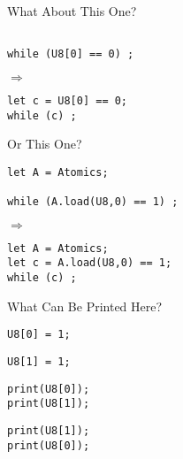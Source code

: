 \documentclass{beamer}
\begin{document}
\begin{frame}[fragile]{What About This One?}
  \begin{minipage}{.45\textwidth}
    \begin{lstlisting}

while (U8[0] == 0) ;
    \end{lstlisting}
  \end{minipage}%
  \hfill$\Rightarrow$\hfill
  \begin{minipage}{.45\textwidth}
    \begin{lstlisting}
let c = U8[0] == 0;
while (c) ;
    \end{lstlisting}
  \end{minipage}
\end{frame}

\begin{frame}[fragile]{Or This One?}
  \begin{minipage}{.45\textwidth}
    \begin{lstlisting}
let A = Atomics;

while (A.load(U8,0) == 1) ;
    \end{lstlisting}
  \end{minipage}%
  \hfill$\Rightarrow$\hfill
  \begin{minipage}{.45\textwidth}
    \begin{lstlisting}
let A = Atomics;
let c = A.load(U8,0) == 1;
while (c) ;
    \end{lstlisting}
  \end{minipage}
\end{frame}

\begin{frame}[fragile]{What Can Be Printed Here?}
  \begin{minipage}{0.2\textwidth}
  \begin{lstlisting}
U8[0] = 1;

  \end{lstlisting}
  \end{minipage}%
  \vrule\hspace{1pt}\vrule
  \begin{minipage}{0.2\textwidth}
  \begin{lstlisting}
U8[1] = 1;

  \end{lstlisting}
  \end{minipage}%
    \vrule\hspace{1pt}\vrule
  \begin{minipage}{0.25\textwidth}
  \begin{lstlisting}
print(U8[0]);
print(U8[1]);
  \end{lstlisting}
  \end{minipage}%
    \vrule\hspace{1pt}\vrule
  \begin{minipage}{0.25\textwidth}
  \begin{lstlisting}
print(U8[1]);
print(U8[0]);
  \end{lstlisting}
  \end{minipage}
\end{frame}
\end{document}
